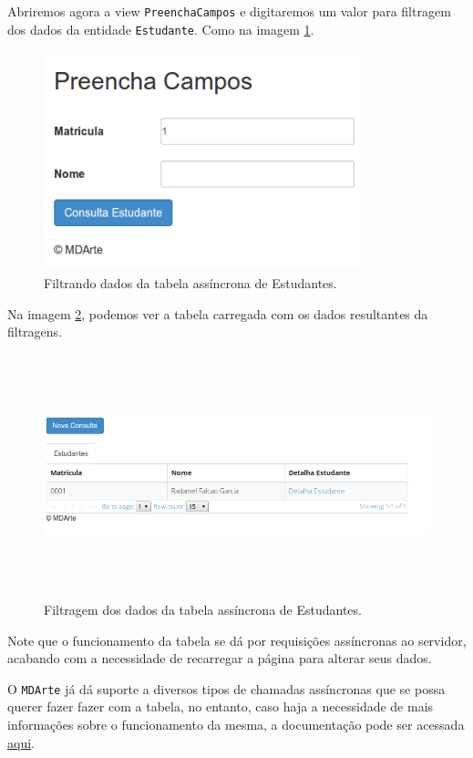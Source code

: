 Abriremos agora a view \texttt{PreenchaCampos} e digitaremos um valor para
filtragem dos dados da entidade \texttt{Estudante}. Como na imagem
\ref{preencha_campos_tabela_async_simples}.
\begin{figure}[H]
	\centering
	\includegraphics[width=260pt,height=180pt]{files/imgs/tutorial-mdarte-0031.png}
	\caption{Filtrando dados da tabela assíncrona de Estudantes.}
	\label{preencha_campos_tabela_async_simples}
\end{figure}

Na imagem \ref{resultado_consulta_tabela_async_simples}, podemos ver a tabela
carregada com os dados resultantes da filtragens. 
\begin{figure}[H]
	\centering
	\includegraphics[width=460pt,height=200pt]{files/imgs/tutorial-mdarte-0032.png}
	\caption{Filtragem dos dados da tabela assíncrona de Estudantes.}
	\label{resultado_consulta_tabela_async_simples}
\end{figure}

Note que o funcionamento da tabela se dá por requisições assíncronas
ao servidor, acabando com a necessidade de recarregar a página para alterar seus
dados. 

O \texttt{MDArte} já dá suporte a diversos tipos de chamadas assíncronas que se
possa querer fazer fazer com a tabela, no entanto, caso haja a necessidade de
mais informações sobre o funcionamento da mesma, a documentação pode ser
acessada \href{http://www.jtable.org/Home/Documents}{aqui}.